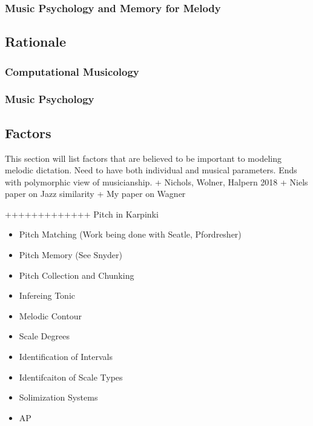 \documentclass[]{book}
\providecommand{\tightlist}{%
  \setlength{\itemsep}{0pt}\setlength{\parskip}{0pt}}
\theoremstyle{definition}
\theoremstyle{definition}
\theoremstyle{definition}
\theoremstyle{remark}
\begin{document}
\hypertarget{music-psychology-and-memory-for-melody}{%
\subsubsection{Music Psychology and Memory for
Melody}\label{music-psychology-and-memory-for-melody}}

\hypertarget{rationale}{%
\subsection{Rationale}\label{rationale}}

\hypertarget{computational-musicology-1}{%
\subsubsection{Computational
Musicology}\label{computational-musicology-1}}

\hypertarget{music-psychology}{%
\subsubsection{Music Psychology}\label{music-psychology}}

\hypertarget{factors}{%
\subsection{Factors}\label{factors}}

This section will list factors that are believed to be important to
modeling melodic dictation. Need to have both individual and musical
parameters. Ends with polymorphic view of musicianship. + Nichols,
Wolner, Halpern 2018 + Niels paper on Jazz similarity + My paper on
Wagner

+++++++++++++ Pitch in Karpinki

\begin{itemize}
\tightlist
\item
  Pitch Matching (Work being done with Seatle, Pfordresher)
\item
  Pitch Memory (See Snyder)
\item
  Pitch Collection and Chunking
\item
  Infereing Tonic
\item
  Melodic Contour
\item
  Scale Degrees
\item
  Identification of Intervals
\item
  Identifcaiton of Scale Types
\item
  Solimization Systems
\item
  AP
\end{itemize}
\end{document}
